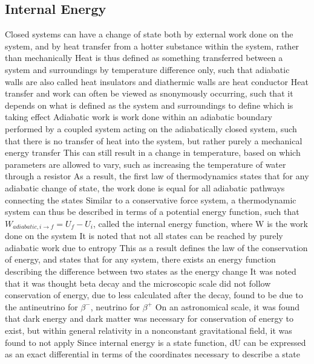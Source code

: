 \documentclass[11 pt, twoside]{article}
\newenvironment{outline*}
{
	\begin{outline}[enumerate]
	}
	{\end{outline}
}
\begin{document}
\subsection{Internal Energy}
\begin{outline*}
\1 Closed systems can have a change of state both by external work done on the system, and by heat transfer from a hotter substance within the system, rather than mechanically
\2 Heat is thus defined as something transferred between a system and surroundings by temperature difference only, such that adiabatic walls are also called heat insulators and diathermic walls are heat conductor
\2 Heat transfer and work can often be viewed as snonymously occurring, such that it depends on what is defined as the system and surroundings to define which is taking effect
\1 Adiabatic work is work done within an adiabatic boundary performed by a coupled system acting on the adiabatically closed system, such that there is no transfer of heat into the system, but rather purely a mechanical energy transfer
\2 This can still result in a change in temperature, based on which parameters are allowed to vary, such as increasing the temperature of water through a resistor
\2 As a result, the first law of thermodynamics states that for any adiabatic change of state, the work done is equal for all adiabatic pathways connecting the states
\3 Similar to a conservative force system, a thermodynamic system can thus be described in terms of a potential energy function, such that $W_{adiabatic, i \to f} = U_f - U_i$, called the internal energy function, where W is the work done on the system
\3 It is noted that not all states can be reached by purely adiabatic work due to entropy
\3 This as a result defines the law of the conservation of energy, and states that for any system, there exists an energy function describing the difference between two states as the energy change
\4 It was noted that it was thought beta decay and the microscopic scale did not follow conservation of energy, due to less calculated after the decay, found to be due to the antineutrino for $\beta^-$, neutrino for $\beta^+$
\4 On an astronomical scale, it was found that dark energy and dark matter was necessary for conservation of energy to exist, but within general relativity in a nonconstant gravitational field, it was found to not apply
\2 Since internal energy is a state function, dU can be expressed as an exact differential in terms of the coordinates necessary to describe a state
\end{outline*}
\end{document}
